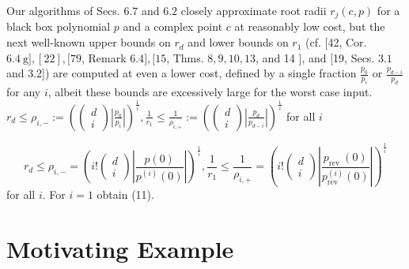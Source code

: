 \documentclass[sigconf]{acmart}
\begin{document}
Our algorithms of Secs. $6.7$ and $6.2$ closely approximate root radii $r_{j}(c, p)$ for a black box polynomial $p$ and a complex point $c$ at reasonably low cost, but the next well-known upper bounds on $r_{d}$ and lower bounds on $r_{1}$ (cf. [42, Cor. $6.4 \mathrm{~g}],[22],[79$, Remark $6.4],[15$, Thms. $8,9,10,13$, and 14 $]$, and [19, Secs. $3.1$ and 3.2]) are computed at even a lower cost, defined by a single fraction $\frac{p_{0}}{p_{i}}$ or $\frac{p_{d-i}}{p_{d}}$ for any $i$, albeit these bounds are excessively large for the worst case input.
$r_{d} \leq \rho_{i,-}:=\left(\left(\begin{array}{c}d \\ i\end{array}\right)\left|\frac{p_{0}}{p_{i}}\right|\right)^{\frac{1}{i}}, \frac{1}{r_{1}} \leq \frac{1}{\rho_{i,+}}:=\left(\left(\begin{array}{l}d \\ i\end{array}\right)\left|\frac{p_{d}}{p_{d-i}}\right|\right)^{\frac{1}{i}}$ for all $i$


\begin{equation}\label{eq:last_appen}
r_{d} \leq \rho_{i,-}=\left(i !\left(\begin{array}{c}
d \\
i
\end{array}\right)\left|\frac{p(0)}{p^{(i)}(0)}\right|\right)^{\frac{1}{i}}, \frac{1}{r_{1}} \leq \frac{1}{\rho_{i,+}}=\left(i !\left(\begin{array}{c}
d \\
i
\end{array}\right)\left|\frac{p_{\text {rev }}(0)}{p_{\text {rev }}^{(i)}(0)}\right|\right)^{\frac{1}{i}}
\end{equation}
for all $i$. For $i=1$ obtain (11).

\section{Motivating Example}
\end{document}
